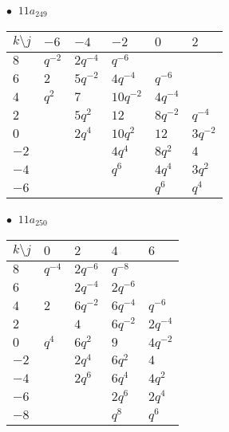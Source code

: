 \begin{minipage}{\linewidth}
$\bullet\ $ $11a_{249}$ \vspace{0.5em} \\
\begin{tabular}{l|lllll}
$k \setminus j$ & $-6$ & $-4$ & $-2$ & $0$ & $2$ \\
\hline
$8$ & $q^{-2}$ & $2q^{-4}$ & $q^{-6}$ &  &  \\
$6$ & $2$ & $5q^{-2}$ & $4q^{-4}$ & $q^{-6}$ &  \\
$4$ & $q^{2}$ & $7$ & $10q^{-2}$ & $4q^{-4}$ &  \\
$2$ &  & $5q^{2}$ & $12$ & $8q^{-2}$ & $q^{-4}$ \\
$0$ &  & $2q^{4}$ & $10q^{2}$ & $12$ & $3q^{-2}$ \\
$-2$ &  &  & $4q^{4}$ & $8q^{2}$ & $4$ \\
$-4$ &  &  & $q^{6}$ & $4q^{4}$ & $3q^{2}$ \\
$-6$ &  &  &  & $q^{6}$ & $q^{4}$ \\
\end{tabular}
\vspace{2em}
\end{minipage}
%
\begin{minipage}{\linewidth}
$\bullet\ $ $11a_{250}$ \vspace{0.5em} \\
\begin{tabular}{l|llll}
$k \setminus j$ & $0$ & $2$ & $4$ & $6$ \\
\hline
$8$ & $q^{-4}$ & $2q^{-6}$ & $q^{-8}$ &  \\
$6$ &  & $2q^{-4}$ & $2q^{-6}$ &  \\
$4$ & $2$ & $6q^{-2}$ & $6q^{-4}$ & $q^{-6}$ \\
$2$ &  & $4$ & $6q^{-2}$ & $2q^{-4}$ \\
$0$ & $q^{4}$ & $6q^{2}$ & $9$ & $4q^{-2}$ \\
$-2$ &  & $2q^{4}$ & $6q^{2}$ & $4$ \\
$-4$ &  & $2q^{6}$ & $6q^{4}$ & $4q^{2}$ \\
$-6$ &  &  & $2q^{6}$ & $2q^{4}$ \\
$-8$ &  &  & $q^{8}$ & $q^{6}$ \\
\end{tabular}
\vspace{2em}
\end{minipage}
%
